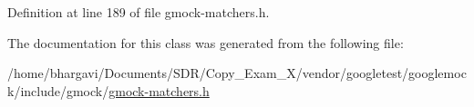 Definition at line 189 of file gmock-\/matchers.\+h.



The documentation for this class was generated from the following file\+:\begin{DoxyCompactItemize}
\item 
/home/bhargavi/\+Documents/\+S\+D\+R/\+Copy\+\_\+\+Exam\+\_\+X/vendor/googletest/googlemock/include/gmock/\hyperlink{gmock-matchers_8h}{gmock-\/matchers.\+h}\end{DoxyCompactItemize}
